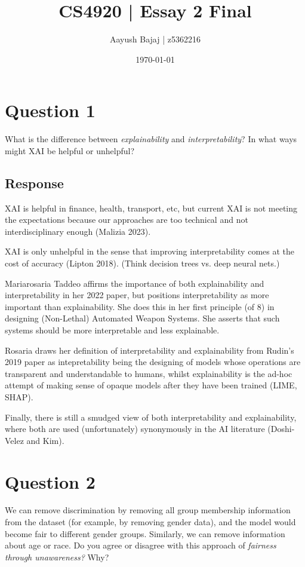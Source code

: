 \documentclass{scrartcl}
\title{CS4920 | Essay 2 Final}
\author{Aayush Bajaj | z5362216}
\date{\today}
\begin{document}
\maketitle
\tableofcontents

\dotfill
\newpage
\section{Question 1}

\begin{tcolorbox}[colback=white,colframe=purple,sharp corners]
    What is the difference between \emph{explainability} and \emph{interpretability}? In what ways might XAI be helpful or unhelpful?
\end{tcolorbox}

\subsection{Response}

XAI is helpful in finance, health, transport, etc, but current XAI is not meeting the expectations because our approaches are too technical and not interdisciplinary enough (Malizia 2023).

XAI is only unhelpful in the sense that improving interpretability comes at the cost of accuracy (Lipton 2018). (Think decision trees vs. deep neural nets.)

Mariarosaria Taddeo affirms the importance of both explainability and interpretability in her 2022 paper, but positions interpretability as more important than explainability. She does this in her first principle (of 8) in designing (Non-Lethal) Automated Weapon Systems. She asserts that such systems should be more interpretable and less explainable.

Rosaria draws her definition of interpretability and explainability from Rudin's 2019 paper as intepretability being the designing of models whose operations are transparent and understandable to humans, whilst explainability is the ad-hoc attempt of making sense of opaque models after they have been trained (LIME, SHAP).

Finally, there is still a smudged view of both interpretability and explainability, where both are used (unfortunately) synonymously in the AI literature (Doshi-Velez and Kim). 

\newpage
\section{Question 2}
\begin{tcolorbox}[colback=white,colframe=purple, sharp corners]
    We can remove discrimination by removing all group membership information from the dataset (for example, by removing gender data), and the model would become fair to different gender groups. Similarly, we can remove information about age or race. Do you agree or disagree with this approach of \emph{fairness through unawareness?} Why?
\end{tcolorbox}
\end{document}
